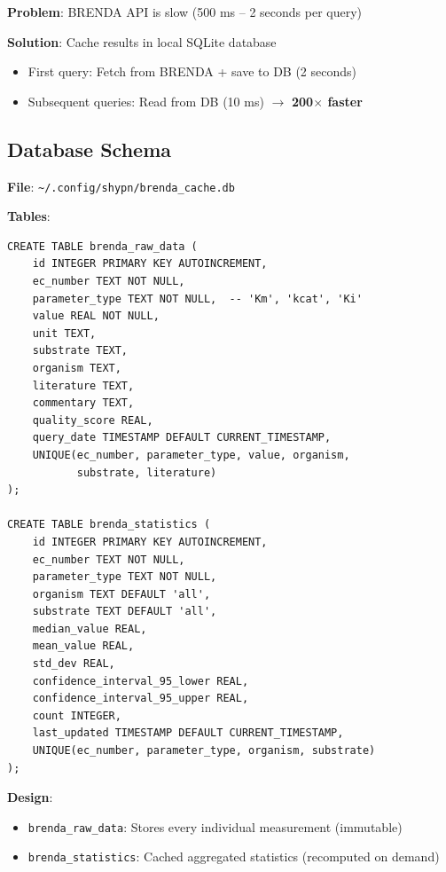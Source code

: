\textbf{Problem}: BRENDA API is slow (500 ms -- 2 seconds per query)

\textbf{Solution}: Cache results in local SQLite database

\begin{itemize}
    \item First query: Fetch from BRENDA + save to DB (2 seconds)
    \item Subsequent queries: Read from DB (10 ms) $\to$ \textbf{200$\times$ faster}
\end{itemize}

\subsection{Database Schema}
\label{subsec:brenda-database-schema}

\textbf{File}: \texttt{\textasciitilde/.config/shypn/brenda\_cache.db}

\textbf{Tables}:

\begin{verbatim}
CREATE TABLE brenda_raw_data (
    id INTEGER PRIMARY KEY AUTOINCREMENT,
    ec_number TEXT NOT NULL,
    parameter_type TEXT NOT NULL,  -- 'Km', 'kcat', 'Ki'
    value REAL NOT NULL,
    unit TEXT,
    substrate TEXT,
    organism TEXT,
    literature TEXT,
    commentary TEXT,
    quality_score REAL,
    query_date TIMESTAMP DEFAULT CURRENT_TIMESTAMP,
    UNIQUE(ec_number, parameter_type, value, organism, 
           substrate, literature)
);

CREATE TABLE brenda_statistics (
    id INTEGER PRIMARY KEY AUTOINCREMENT,
    ec_number TEXT NOT NULL,
    parameter_type TEXT NOT NULL,
    organism TEXT DEFAULT 'all',
    substrate TEXT DEFAULT 'all',
    median_value REAL,
    mean_value REAL,
    std_dev REAL,
    confidence_interval_95_lower REAL,
    confidence_interval_95_upper REAL,
    count INTEGER,
    last_updated TIMESTAMP DEFAULT CURRENT_TIMESTAMP,
    UNIQUE(ec_number, parameter_type, organism, substrate)
);
\end{verbatim}

\textbf{Design}:

\begin{itemize}
    \item \texttt{brenda\_raw\_data}: Stores every individual measurement (immutable)
    \item \texttt{brenda\_statistics}: Cached aggregated statistics (recomputed on demand)
\end{itemize}

